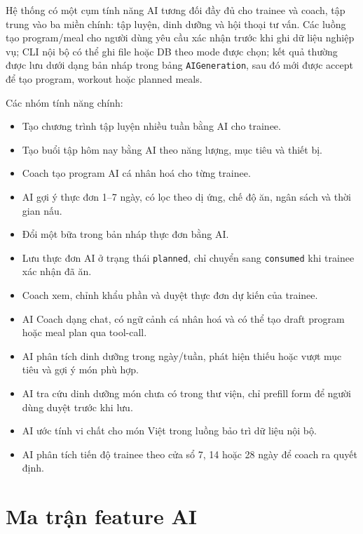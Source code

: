 \documentclass[12pt,a4paper]{article}
\newcommand{\code}[1]{\texttt{#1}}
\begin{document}
Hệ thống có một cụm tính năng AI tương đối đầy đủ cho trainee và coach, tập trung vào ba miền chính: tập luyện, dinh dưỡng và hội thoại tư vấn. Các luồng tạo program/meal cho người dùng yêu cầu xác nhận trước khi ghi dữ liệu nghiệp vụ; CLI nội bộ có thể ghi file hoặc DB theo mode được chọn; kết quả thường được lưu dưới dạng bản nháp trong bảng \code{AIGeneration}, sau đó mới được accept để tạo program, workout hoặc planned meals.

Các nhóm tính năng chính:

\begin{itemize}
  \item Tạo chương trình tập luyện nhiều tuần bằng AI cho trainee.
  \item Tạo buổi tập hôm nay bằng AI theo năng lượng, mục tiêu và thiết bị.
  \item Coach tạo program AI cá nhân hoá cho từng trainee.
  \item AI gợi ý thực đơn 1--7 ngày, có lọc theo dị ứng, chế độ ăn, ngân sách và thời gian nấu.
  \item Đổi một bữa trong bản nháp thực đơn bằng AI.
  \item Lưu thực đơn AI ở trạng thái \code{planned}, chỉ chuyển sang \code{consumed} khi trainee xác nhận đã ăn.
  \item Coach xem, chỉnh khẩu phần và duyệt thực đơn dự kiến của trainee.
  \item AI Coach dạng chat, có ngữ cảnh cá nhân hoá và có thể tạo draft program hoặc meal plan qua tool-call.
  \item AI phân tích dinh dưỡng trong ngày/tuần, phát hiện thiếu hoặc vượt mục tiêu và gợi ý món phù hợp.
  \item AI tra cứu dinh dưỡng món chưa có trong thư viện, chỉ prefill form để người dùng duyệt trước khi lưu.
  \item AI ước tính vi chất cho món Việt trong luồng bảo trì dữ liệu nội bộ.
  \item AI phân tích tiến độ trainee theo cửa sổ 7, 14 hoặc 28 ngày để coach ra quyết định.
\end{itemize}

\section{Ma trận feature AI}
\end{document}
